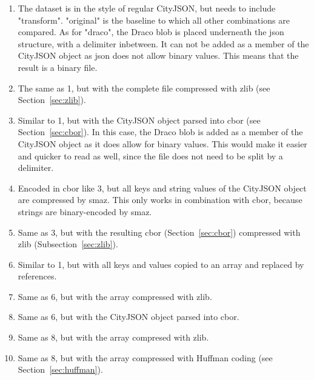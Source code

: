 \begin{enumerate}
\item The dataset is in the style of regular CityJSON, but needs to include "transform". "original" is the baseline to which all other combinations are compared. 
As for "draco", the Draco \ac{blob} is placed underneath the \ac{json} structure, with a delimiter inbetween. 
It can not be added as a member of the CityJSON object as \ac{json} does not allow binary values.
This means that the result is a binary file.
\item The same as 1, but with the complete file compressed with zlib (see Section~\ref{sec:zlib}).
\item Similar to 1, but with the CityJSON object parsed into \ac{cbor} (see Section~\ref{sec:cbor}). 
In this case, the Draco \ac{blob} is added as a member of the CityJSON object as it does allow for binary values.
This would make it easier and quicker to read as well, since the file does not need to be split by a delimiter.
\item Encoded in \ac{cbor} like 3, but all keys and string values of the CityJSON object are compressed by smaz.
This only works in combination with cbor, because strings are binary-encoded by smaz.
\item Same as 3, but with the resulting \ac{cbor} (Section~\ref{sec:cbor}) compressed with zlib (Subsection~\ref{sec:zlib}).
\item Similar to 1, but with all keys and values copied to an array and replaced by references.
\item Same as 6, but with the array  compressed with zlib.
\item Same as 6, but with the CityJSON object parsed into \ac{cbor}.
\item Same as 8, but with the array compresed with zlib.
\item Same as 8, but with the array compressed with Huffman coding (see Section~\ref{sec:huffman}).
\end{enumerate}




